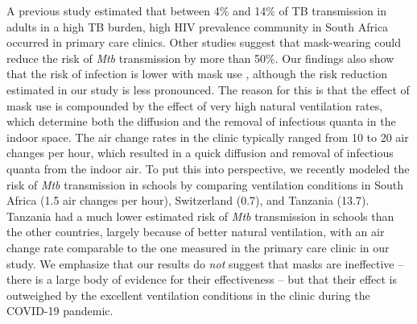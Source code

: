 \documentclass[fleqn,11pt]{wlscirep}
\begin{document}
A previous study estimated that between 4\% and 14\% of TB transmission in adults in a high TB burden, high HIV prevalence community in South Africa occurred in primary care clinics\cite{McCreesh2022BMJGlobalHealth}. Other studies suggest that mask-wearing could reduce the risk of \emph{Mtb} transmission by more than 50\%\cite{Dharmadhikari2012AJRCCM,McCreesh2021BMJGlobalHealth}. Our findings also show that the risk of infection is lower with mask use , although the risk reduction estimated in our study is less pronounced. The reason for this is that the effect of mask use is compounded by the effect of very high natural ventilation rates, which determine both the diffusion and the removal of infectious quanta in the indoor space. The air change rates in the clinic typically ranged from 10 to 20 air changes per hour, which resulted in a quick diffusion and removal of infectious quanta from the indoor air. To put this into perspective, we recently modeled the risk of \emph{Mtb} transmission in schools by comparing ventilation conditions in South Africa (1.5 air changes per hour), Switzerland (0.7), and Tanzania (13.7)\cite{Banholzer2024PGPH}. Tanzania had a much lower estimated risk of \emph{Mtb} transmission in schools than the other countries, largely because of better natural ventilation, with an air change rate comparable to the one measured in the primary care clinic in our study. We emphasize that our results do \emph{not} suggest that masks are ineffective -- there is a large body of evidence for their effectiveness -- but that their effect is outweighed by the excellent ventilation conditions in the clinic during the COVID-19 pandemic.

\end{document}
